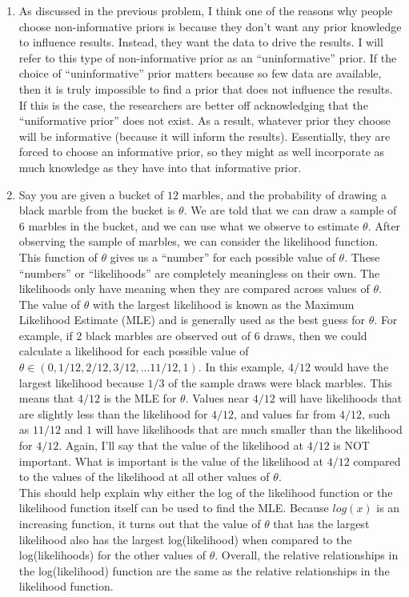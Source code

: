 \documentclass[11pt]{article}\usepackage[]{graphicx}\usepackage[]{color}
\begin{document}
\begin{doublespacing}
\begin{enumerate}
\item As discussed in the previous problem, I think one of the reasons why people choose non-informative priors is because they don't want any prior knowledge to influence results. Instead, they want the data to drive the results. I will refer to this type of non-informative prior as an ``uninformative'' prior. If the choice of ``uninformative'' prior matters because so few data are available, then it is truly impossible to find a prior that does not influence the results. If this is the case, the researchers are better off acknowledging that the ``uniformative prior'' does not exist. As a result, whatever prior they choose will be informative (because it will inform the results). Essentially, they are forced to choose an informative prior, so they might as well incorporate as much knowledge as they have into that informative prior. 

\item Say you are given a bucket of $12$ marbles, and the probability of drawing a black marble from the bucket is $\theta$. We are told that we can draw a sample of $6$ marbles in the bucket, and we can use what we observe to estimate $\theta$. After observing the sample of marbles, we can consider the likelihood function. This function of $\theta$ gives us a ``number'' for each possible value of $\theta$. These ``numbers'' or ``likelihoods'' are completely meaningless on their own. The likelihoods only have meaning when they are compared across values of $\theta$. The value of $\theta$ with the largest likelihood is known as the Maximum Likelihood Estimate (MLE) and is generally used as the best guess for $\theta$. For example, if $2$ black marbles are observed out of $6$ draws, then we could calculate a likelihood for each possible value of $\theta \in (0, 1/12, 2/12, 3/12,...11/12, 1)$. In this example, $4/12$ would have the largest likelihood because $1/3$ of the sample draws were black marbles. This means that $4/12$ is the MLE for $\theta$. Values near $4/12$ will have likelihoods that are slightly less than the likelihood for $4/12$, and values far from $4/12$, such as $11/12$ and $1$ will have likelihoods that are much smaller than the likelihood for $4/12$. Again, I'll say that the value of the likelihood at $4/12$ is NOT important. What is important is the value of the likelihood at $4/12$ compared to the values of the likelihood at all other values of $\theta$.  \\

\noindent This should help explain why either the log of the likelihood function or the likelihood function itself can be used to find the MLE. Because $log(x)$ is an increasing function, it turns out that the value of $\theta$ that has the largest likelihood also has the largest log(likelihood) when compared to the log(likelihoods) for the other values of $\theta$. Overall, the relative relationships in the log(likelihood) function are the same as the relative relationships in the likelihood function.  \\


\end{enumerate}
\end{doublespacing}
\end{document}
